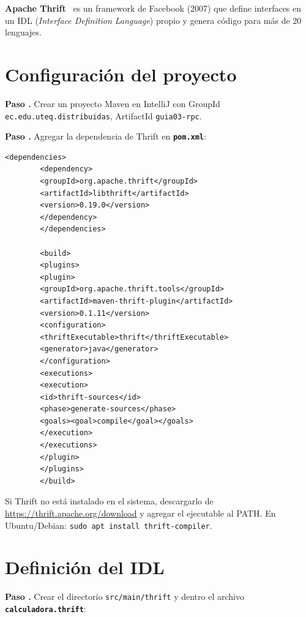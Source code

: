 \documentclass[12pt, a4paper, openany]{book}
\newcounter{paso}[section]
\newcommand{\paso}[1]{%
	\stepcounter{paso}%
	\medskip\noindent
	\begin{tcolorbox}[enhanced, colback=white, colframe=practiceBlue,
		boxrule=0.8pt, arc=3pt, left=6pt, right=6pt, top=4pt, bottom=4pt,
		before upper={\noindent}]
		\textcolor{practiceBlue}{\textbf{Paso \arabic{paso}.}} #1
	\end{tcolorbox}%
}
\newcommand{\code}[1]{\texttt{\small#1}}
\newcommand{\archivo}[1]{\texttt{\textbf{#1}}}
\begin{document}
	\textbf{Apache Thrift}~\parencite{slee2007} es un framework de Facebook (2007) que
	define interfaces en un IDL (\textit{Interface Definition Language}) propio y genera
	código para más de 20 lenguajes.
	
	\section{Configuración del proyecto}
	
	\paso{Crear un proyecto Maven en IntelliJ con GroupId
		\code{ec.edu.uteq.distribuidas}, ArtifactId \code{guia03-rpc}.}
	
	\paso{Agregar la dependencia de Thrift en \archivo{pom.xml}:}
	
	\begin{lstlisting}[style=XMLStyle, caption={pom.xml --- Dependencia Apache Thrift}]
		<dependencies>
		<dependency>
		<groupId>org.apache.thrift</groupId>
		<artifactId>libthrift</artifactId>
		<version>0.19.0</version>
		</dependency>
		</dependencies>
		
		<build>
		<plugins>
		<plugin>
		<groupId>org.apache.thrift.tools</groupId>
		<artifactId>maven-thrift-plugin</artifactId>
		<version>0.1.11</version>
		<configuration>
		<thriftExecutable>thrift</thriftExecutable>
		<generator>java</generator>
		</configuration>
		<executions>
		<execution>
		<id>thrift-sources</id>
		<phase>generate-sources</phase>
		<goals><goal>compile</goal></goals>
		</execution>
		</executions>
		</plugin>
		</plugins>
		</build>
	\end{lstlisting}
	
	\begin{notabox}
		Si Thrift no está instalado en el sistema, descargarlo de
		\url{https://thrift.apache.org/download} y agregar el ejecutable al PATH.
		En Ubuntu/Debian: \code{sudo apt install thrift-compiler}.
	\end{notabox}
	
	\section{Definición del IDL}
	
	\paso{Crear el directorio \code{src/main/thrift} y dentro el archivo
		\archivo{calculadora.thrift}:}
	
\end{document}
